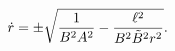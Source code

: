 \begin{equation}
\dot{r}=\pm \sqrt{{1\over B^{2}A^{2}}
-{\ell^{2}\over B^{2}\tilde{B}^{2}r^{2}}}.
\label{eq:dotr}
\end{equation}


